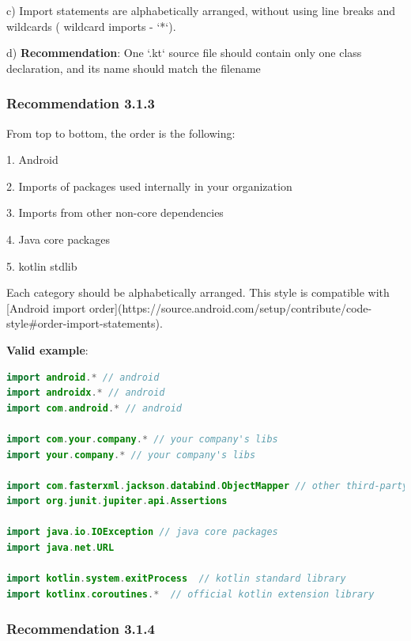 c) Import statements are alphabetically arranged, without using line breaks and wildcards ( wildcard imports - `*`).



d) \textbf{Recommendation}: One `.kt` source file should contain only one class declaration, and its name should match the filename



\subsubsection*{\textbf{Recommendation 3.1.3}}
\leavevmode\newline



From top to bottom, the order is the following:

1. Android

2. Imports of packages used internally in your organization

3. Imports from other non-core dependencies

4. Java core packages

5. kotlin stdlib



Each category should be alphabetically arranged. This style is compatible with  [Android import order](https://source.android.com/setup/contribute/code-style\#order-import-statements).



\textbf{Valid example}:

\begin{lstlisting}[language=Kotlin]
import android.* // android
import androidx.* // android
import com.android.* // android

import com.your.company.* // your company's libs
import your.company.* // your company's libs

import com.fasterxml.jackson.databind.ObjectMapper // other third-party dependencies
import org.junit.jupiter.api.Assertions

import java.io.IOException // java core packages
import java.net.URL

import kotlin.system.exitProcess  // kotlin standard library
import kotlinx.coroutines.*  // official kotlin extension library
\end{lstlisting}


\subsubsection*{\textbf{Recommendation 3.1.4}}
\leavevmode\newline




